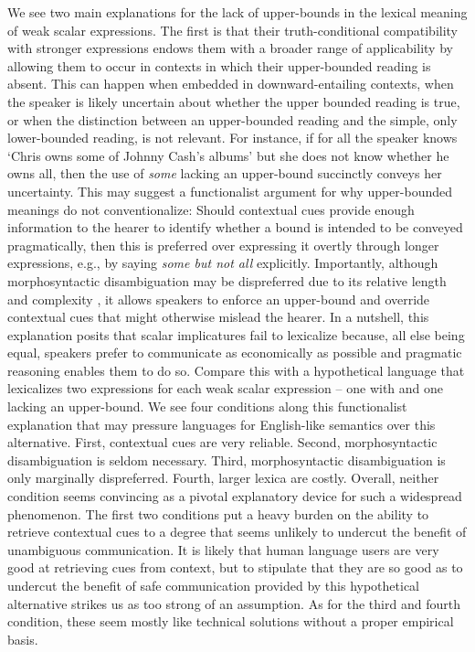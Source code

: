 \documentclass[a4paper]{article}
\begin{document}
We see two main explanations for the lack of upper-bounds in the lexical meaning of weak scalar expressions. The first is that their truth-conditional compatibility with stronger expressions endows them with a broader range of applicability by allowing them to occur in contexts in which their upper-bounded reading is absent. This can happen when embedded in downward-entailing contexts, when the speaker is likely uncertain about whether the upper bounded reading is true, or when the distinction between an upper-bounded reading and the simple, only lower-bounded reading, is not relevant. For instance, if for all the speaker knows `Chris owns some of Johnny Cash's albums' but she does not know whether he owns all, then the use of {\em some} lacking an upper-bound succinctly conveys her uncertainty. This may suggest a functionalist argument for why upper-bounded meanings do not conventionalize: Should contextual cues provide enough information to the hearer to identify whether a bound is intended to be conveyed pragmatically, then this is preferred over expressing it overtly through longer expressions, e.g., by saying {\em some but not all} explicitly. Importantly, although morphosyntactic disambiguation may be dispreferred due to its relative length and complexity \citep{piantadosi+etal:2012b}, it allows speakers to enforce an upper-bound and override contextual cues that might otherwise mislead the hearer. In a nutshell, this explanation posits that scalar implicatures fail to lexicalize because, all else being equal, speakers prefer to communicate as economically as possible and pragmatic reasoning enables them to do so. Compare this with a hypothetical language that lexicalizes two expressions for each weak scalar expression -- one with and one lacking an upper-bound. We see four conditions along this functionalist explanation that may pressure languages for English-like semantics over this alternative. First, contextual cues are very reliable. Second, morphosyntactic disambiguation is seldom necessary. Third, morphosyntactic disambiguation is only marginally dispreferred. Fourth, larger lexica are costly. Overall, neither condition seems convincing as a pivotal explanatory device for such a widespread phenomenon. The first two conditions put a heavy burden on the ability to retrieve contextual cues to a degree that seems unlikely to undercut the benefit of unambiguous communication. It is likely that human language users are very good at retrieving cues from context, but to stipulate that they are so good as to undercut the benefit of safe communication provided by this hypothetical alternative strikes us as too strong of an assumption.  As for the third and fourth condition, these seem mostly like technical solutions without a proper empirical basis. 
\end{document}
